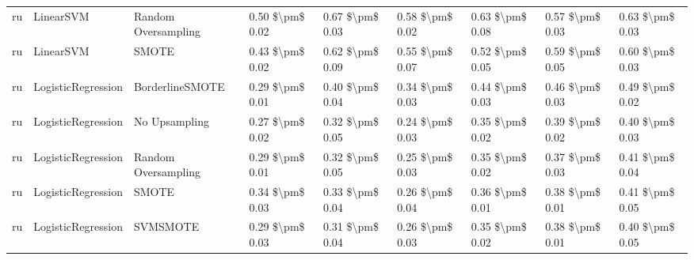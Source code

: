 \begin{tabular}{lllllllll}
      ru &                       LinearSVM &           Random Oversampling &     0.50 \$\textbackslash pm\$ 0.02 &           0.67 \$\textbackslash pm\$ 0.03 &       0.58 \$\textbackslash pm\$ 0.02 &        0.63 \$\textbackslash pm\$ 0.08 &                         0.57 \$\textbackslash pm\$ 0.03 &     0.63 \$\textbackslash pm\$ 0.03 \\
      ru &                       LinearSVM &                         SMOTE &     0.43 \$\textbackslash pm\$ 0.02 &           0.62 \$\textbackslash pm\$ 0.09 &       0.55 \$\textbackslash pm\$ 0.07 &        0.52 \$\textbackslash pm\$ 0.05 &                         0.59 \$\textbackslash pm\$ 0.05 &     0.60 \$\textbackslash pm\$ 0.03 \\
      ru &              LogisticRegression &               BorderlineSMOTE &     0.29 \$\textbackslash pm\$ 0.01 &           0.40 \$\textbackslash pm\$ 0.04 &       0.34 \$\textbackslash pm\$ 0.03 &        0.44 \$\textbackslash pm\$ 0.03 &                         0.46 \$\textbackslash pm\$ 0.03 &     0.49 \$\textbackslash pm\$ 0.02 \\
      ru &              LogisticRegression &                 No Upsampling &     0.27 \$\textbackslash pm\$ 0.02 &           0.32 \$\textbackslash pm\$ 0.05 &       0.24 \$\textbackslash pm\$ 0.03 &        0.35 \$\textbackslash pm\$ 0.02 &                         0.39 \$\textbackslash pm\$ 0.02 &     0.40 \$\textbackslash pm\$ 0.03 \\
      ru &              LogisticRegression &           Random Oversampling &     0.29 \$\textbackslash pm\$ 0.01 &           0.32 \$\textbackslash pm\$ 0.05 &       0.25 \$\textbackslash pm\$ 0.03 &        0.35 \$\textbackslash pm\$ 0.02 &                         0.37 \$\textbackslash pm\$ 0.03 &     0.41 \$\textbackslash pm\$ 0.04 \\
      ru &              LogisticRegression &                         SMOTE &     0.34 \$\textbackslash pm\$ 0.03 &           0.33 \$\textbackslash pm\$ 0.04 &       0.26 \$\textbackslash pm\$ 0.04 &        0.36 \$\textbackslash pm\$ 0.01 &                         0.38 \$\textbackslash pm\$ 0.01 &     0.41 \$\textbackslash pm\$ 0.05 \\
      ru &              LogisticRegression &                      SVMSMOTE &     0.29 \$\textbackslash pm\$ 0.03 &           0.31 \$\textbackslash pm\$ 0.04 &       0.26 \$\textbackslash pm\$ 0.03 &        0.35 \$\textbackslash pm\$ 0.02 &                         0.38 \$\textbackslash pm\$ 0.01 &     0.40 \$\textbackslash pm\$ 0.05 \\

\end{tabular}
